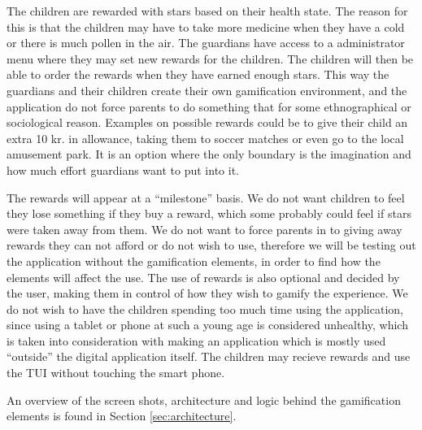 The children are rewarded with stars based on their health state. The reason for this is that the children may have to take more medicine when they have a cold or there is much pollen in the air. The guardians have access to a administrator menu where they may set new rewards for the children. The children will then be able to order the rewards when they have earned enough stars. This way the guardians and their children create their own gamification environment, and the application do not force parents to do something that for some ethnographical or sociological reason. Examples on possible rewards could be to give their child an extra 10 kr. in allowance, taking them to soccer matches or even go to the local amusement park. It is an option where the only boundary is the imagination and how much effort guardians want to put into it.    


The rewards will appear at a ``milestone'' basis. We do not want children to feel they lose something if they buy a reward, which some probably could feel if stars were taken away from them. We do not want to force parents in to giving away rewards they can not afford or do not wish to use, therefore we will be testing out the application without the gamification elements, in order to find how the elements will affect the use. The use of rewards is also optional and decided by the user, making them in control of how they wish to gamify the experience. 
We do not wish to have the children spending too much time using the application, since using a tablet or phone at such a young age is considered unhealthy, which is taken into consideration with making an application which is mostly used ``outside'' the digital application itself. The children may recieve rewards and use the TUI without touching the smart phone.

An overview of the screen shots, architecture and logic behind the gamification elements is found in Section \ref{sec:architecture}.

